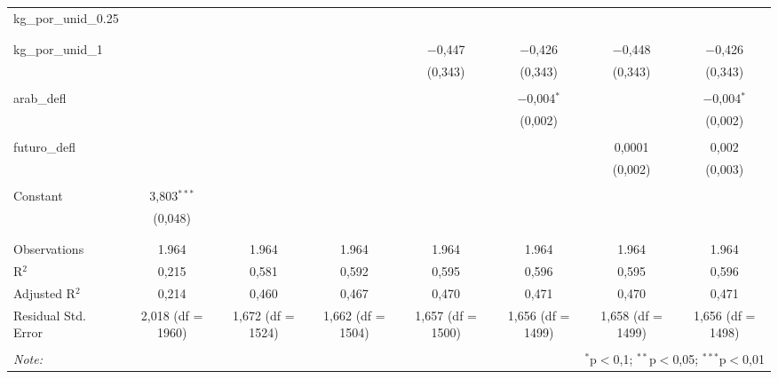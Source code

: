 \begin{table}[!htbp]
\begin{tabular}{@{\extracolsep{5pt}}lccccccc}
 kg\_por\_unid\_0.25 &  &  &  &  &  &  &  \\ 
  &  &  &  &  &  &  &  \\ 
  & & & & & & & \\ 
 kg\_por\_unid\_1 &  &  &  & $-$0,447 & $-$0,426 & $-$0,448 & $-$0,426 \\ 
  &  &  &  & (0,343) & (0,343) & (0,343) & (0,343) \\ 
  & & & & & & & \\ 
 arab\_defl &  &  &  &  & $-$0,004$^{*}$ &  & $-$0,004$^{*}$ \\ 
  &  &  &  &  & (0,002) &  & (0,002) \\ 
  & & & & & & & \\ 
 futuro\_defl &  &  &  &  &  & 0,0001 & 0,002 \\ 
  &  &  &  &  &  & (0,002) & (0,003) \\ 
  & & & & & & & \\ 
 Constant & 3,803$^{***}$ &  &  &  &  &  &  \\ 
  & (0,048) &  &  &  &  &  &  \\ 
  & & & & & & & \\ 
\hline \\[-1.8ex] 
Observations & 1.964 & 1.964 & 1.964 & 1.964 & 1.964 & 1.964 & 1.964 \\ 
R$^{2}$ & 0,215 & 0,581 & 0,592 & 0,595 & 0,596 & 0,595 & 0,596 \\ 
Adjusted R$^{2}$ & 0,214 & 0,460 & 0,467 & 0,470 & 0,471 & 0,470 & 0,471 \\ 
Residual Std. Error & 2,018 (df = 1960) & 1,672 (df = 1524) & 1,662 (df = 1504) & 1,657 (df = 1500) & 1,656 (df = 1499) & 1,658 (df = 1499) & 1,656 (df = 1498) \\ 
\hline 
\hline \\[-1.8ex] 
\textit{Note:}  & \multicolumn{7}{r}{$^{*}$p$<$0,1; $^{**}$p$<$0,05; $^{***}$p$<$0,01} \\ 
\end{tabular} 
\end{table} 
